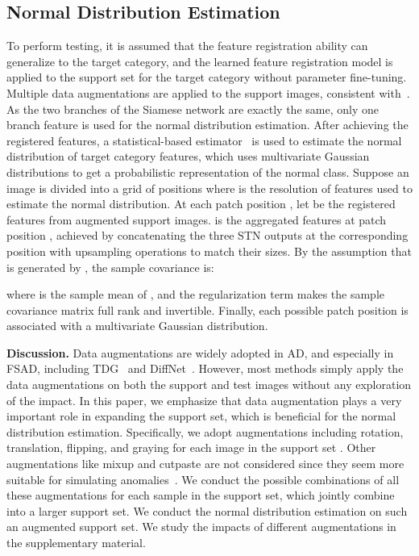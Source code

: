 \documentclass[runningheads]{llncs}
\begin{document}
\subsection{Normal Distribution Estimation}
To perform testing, it is assumed that the feature registration ability can generalize to the target category, and the learned feature registration model is applied to the support set  for the target category without parameter fine-tuning. Multiple data augmentations are applied to the support images, consistent with~\cite{TDG}. As the two branches of the Siamese network are exactly the same, only one branch feature is used for the normal distribution estimation. After achieving the registered features, a statistical-based estimator~\cite{defard2021padim} is used to estimate the normal distribution of target category features, which uses multivariate Gaussian distributions to get a probabilistic representation of the normal class. Suppose an image is divided into a grid of  positions where  is the resolution of features used to estimate the normal distribution. At each patch position , let  be the registered features from  augmented support images.  is the aggregated features at patch position , achieved by concatenating the three STN outputs at the corresponding position with upsampling operations to match their sizes. By the assumption that  is generated by , the sample covariance is:

where  is the sample mean of , and the regularization term  makes the sample covariance matrix full rank and invertible. Finally, each possible patch position is associated with a multivariate Gaussian distribution.

\textbf{Discussion.} Data augmentations are widely adopted in AD, and especially in FSAD, including TDG~\cite{TDG} and DiffNet~\cite{DiffNet}. However, most methods simply apply the data augmentations on both the support and test images without any exploration of the impact. In this paper, we emphasize that data augmentation plays a very important role in expanding the support set, which is beneficial for the normal distribution estimation. Specifically, we adopt augmentations including rotation, translation, flipping, and graying for each image in the support set . Other augmentations like mixup and cutpaste are not considered since they seem more suitable for simulating anomalies~\cite{cutpaste}. We conduct the possible combinations of all these augmentations for each sample in the support set, which jointly combine into a larger support set. We conduct the normal distribution estimation on such an augmented support set. We study the impacts of different augmentations in the supplementary material.
\end{document}
